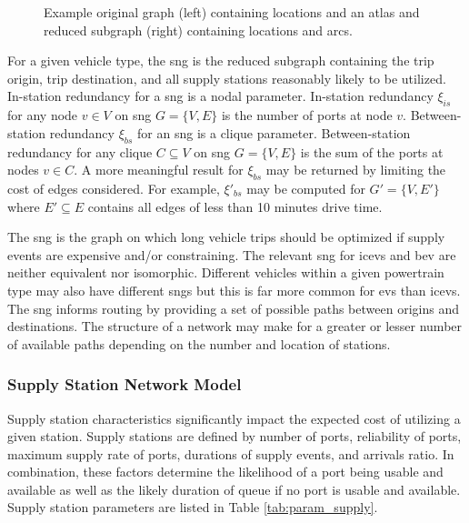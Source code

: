 \documentclass[11pt]{article}
\begin{document}
\begin{multicols}{2}
\begin{figure}[H]
\begin{subfigure}[t]{.5\linewidth}
	\end{subfigure}
	\caption{Example original graph (left) containing locations and an atlas and reduced subgraph (right) containing locations and arcs.}
	\label{fig:reduced_subgraph}
\end{figure}

For a given vehicle type, the \gls{sng} is the reduced subgraph containing the trip origin, trip destination, and all supply stations reasonably likely to be utilized. In-station redundancy for a \gls{sng} is a nodal parameter. In-station  redundancy $\xi_{is}$ for any node $v \in V$ on \gls{sng} $G = \{V, E\}$ is the number of ports at node $v$. Between-station redundancy $\xi_{bs}$ for an \gls{sng} is a clique parameter. Between-station redundancy for any clique $C \subseteq V$ on \gls{sng} $G = \{V, E\}$ is the sum of the ports at nodes $v \in C$. A more meaningful result for $\xi_{bs}$ may be returned by limiting the cost of edges considered. For example, $\xi'_{bs}$ may be computed for $G' = \{V, E'\}$ where $E' \subseteq E$ contains all edges of less than 10 minutes drive time.

The \gls{sng} is the graph on which long vehicle trips should be optimized if supply events are expensive and/or constraining. The relevant \gls{sng} for \glspl{icev} and \gls{bev} are neither equivalent nor isomorphic. Different vehicles within a given powertrain type may also have different \glspl{sng} but this is far more common for \glspl{ev} than \glspl{icev}. The \gls{sng} informs routing by providing a set of possible paths between origins and destinations. The structure of a network may make for a greater or lesser number of available paths depending on the number and location of stations.

\subsubsection*{Supply Station Network Model}

Supply station characteristics significantly impact the expected cost of utilizing a given station. Supply stations are defined by number of ports, reliability of ports, maximum supply rate of ports, durations of supply events, and arrivals ratio. In combination, these factors determine the likelihood of a port being usable and available as well as the likely duration of queue if no port is usable and available. Supply station parameters are listed in Table \ref{tab:param_supply}.


\end{multicols}
\end{document}
